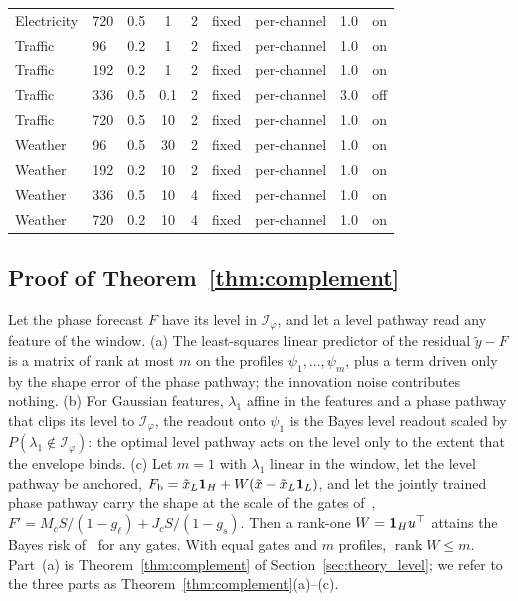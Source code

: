 {\begin{table}[t]
\begin{tabular}{llccclccc}
Electricity & 720 & 0.5 & 1 & 2 & fixed & per-channel & 1.0 & on \\
Traffic & 96 & 0.2 & 1 & 2 & fixed & per-channel & 1.0 & on \\
Traffic & 192 & 0.2 & 1 & 2 & fixed & per-channel & 1.0 & on \\
Traffic & 336 & 0.5 & 0.1 & 2 & fixed & per-channel & 3.0 & off \\
Traffic & 720 & 0.5 & 10 & 2 & fixed & per-channel & 1.0 & on \\
Weather & 96 & 0.5 & 30 & 2 & fixed & per-channel & 1.0 & on \\
Weather & 192 & 0.2 & 10 & 2 & fixed & per-channel & 1.0 & on \\
Weather & 336 & 0.5 & 10 & 4 & fixed & per-channel & 1.0 & on \\
Weather & 720 & 0.2 & 10 & 4 & fixed & per-channel & 1.0 & on \\
\bottomrule
\end{tabular}
\end{table}

\subsection{Proof of Theorem~\ref{thm:complement}}
\label{app:proof_complement}

 Let the phase forecast $F$ have its level in $\mathcal I_\varphi$, and let a level pathway read any feature of the window.
(a) The least-squares linear predictor of the residual $\tilde y-F$ is a matrix of rank at most $m$ on the profiles $\psi_1,\dots,\psi_m$, plus a term driven only by the shape error of the phase pathway; the innovation noise contributes nothing.
(b) For Gaussian features, $\lambda_1$ affine in the features and a phase pathway that clips its level to $\mathcal I_\varphi$, the readout onto $\psi_1$ is the Bayes level readout scaled by $P(\lambda_1\notin\mathcal I_\varphi)$: the optimal level pathway acts on the level only to the extent that the envelope binds.
(c) Let $m=1$ with $\lambda_1$ linear in the window, let the level pathway be anchored, $F_{\mathrm b}=\tilde x_L\mathbf 1_H+W(\tilde x-\tilde x_L\mathbf 1_L)$, and let the jointly trained phase pathway carry the shape at the scale of the gates of~, $F'=M_cS/(1-g_\ell)+J_cS/(1-g_s)$. Then a rank-one $W=\mathbf 1_Hu^\top$ attains the Bayes risk of~ for any gates. With equal gates and $m$ profiles, $\operatorname{rank}W\le m$.
Part~(a) is Theorem~\ref{thm:complement} of Section~\ref{sec:theory_level}; we refer to the three parts as Theorem~\ref{thm:complement}(a)--(c).

}
